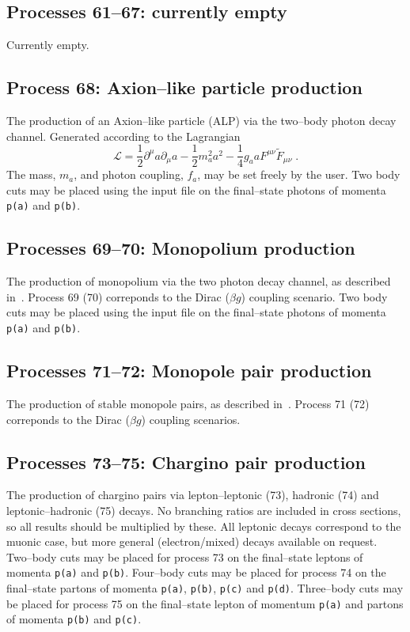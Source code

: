 \documentclass[12pt]{article}
\begin{document}
\subsection{Processes 61--67: currently empty}

Currently empty.

\subsection{Process 68: Axion--like particle production}

The production of an Axion--like particle (ALP) via the two--body photon decay channel. Generated according to the Lagrangian
\begin{equation}
\mathcal{L}=\frac{1}{2}\partial^\mu a \partial_\mu a -\frac{1}{2}m_a^2 a^2 -\frac{1}{4}g_a a F^{\mu\nu}\tilde{F}_{\mu\nu}\;.
\end{equation}
The mass, $m_a$, and photon coupling, $f_a$, may be set freely by the user.  Two body cuts may be placed using the input file on the final--state photons of momenta  \texttt{p(a)} and \texttt{p(b)}.

\subsection{Processes 69--70: Monopolium production}

The production of monopolium via the two photon decay channel, as described in~\cite{Epele:2012jn}. Process 69 (70) correponds to the Dirac ($\beta g$) coupling scenario. Two body cuts may be placed using the input file on the final--state photons of momenta  \texttt{p(a)} and \texttt{p(b)}.  

\subsection{Processes 71--72: Monopole pair production}

The production of stable monopole pairs, as described in~\cite{Epele:2012jn}. Process 71 (72) correponds to the Dirac ($\beta g$) coupling scenarios.

\subsection{Processes 73--75: Chargino pair production}

The production of chargino pairs via lepton--leptonic (73), hadronic (74) and leptonic--hadronic (75) decays. No branching ratios are included in cross sections, so all results should be multiplied by these. All leptonic decays correspond to the muonic case, but more general (electron/mixed) decays available on request. Two--body cuts may be placed for process 73 on the final--state leptons of momenta  \texttt{p(a)} and \texttt{p(b)}. Four--body cuts may be placed for process 74 on the final--state partons of momenta  \texttt{p(a)}, \texttt{p(b)}, \texttt{p(c)} and \texttt{p(d)}. Three--body cuts may be placed for process 75 on the final--state lepton of momentum  \texttt{p(a)} and partons of momenta \texttt{p(b)} and \texttt{p(c)}.
\end{document}
